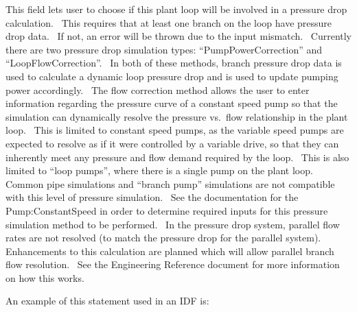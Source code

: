 This field lets user to choose if this plant loop will be involved in a pressure drop calculation.~ This requires that at least one branch on the loop have pressure drop data.~ If not, an error will be thrown due to the input mismatch.~ Currently there are two pressure drop simulation types: ``PumpPowerCorrection'' and ``LoopFlowCorrection''.~ In both of these methods, branch pressure drop data is used to calculate a dynamic loop pressure drop and is used to update pumping power accordingly.~ The flow correction method allows the user to enter information regarding the pressure curve of a constant speed pump so that the simulation can dynamically resolve the pressure vs.~flow relationship in the plant loop.~ This is limited to constant speed pumps, as the variable speed pumps are expected to resolve as if it were controlled by a variable drive, so that they can inherently meet any pressure and flow demand required by the loop.~ This is also limited to ``loop pumps'', where there is a single pump on the plant loop.~ Common pipe simulations and ``branch pump'' simulations are not compatible with this level of pressure simulation.~ See the documentation for the Pump:ConstantSpeed in order to determine required inputs for this pressure simulation method to be performed.~ In the pressure drop system, parallel flow rates are not resolved (to match the pressure drop for the parallel system).~ Enhancements to this calculation are planned which will allow parallel branch flow resolution.~ See the Engineering Reference document for more information on how this works.

An example of this statement used in an IDF is:

